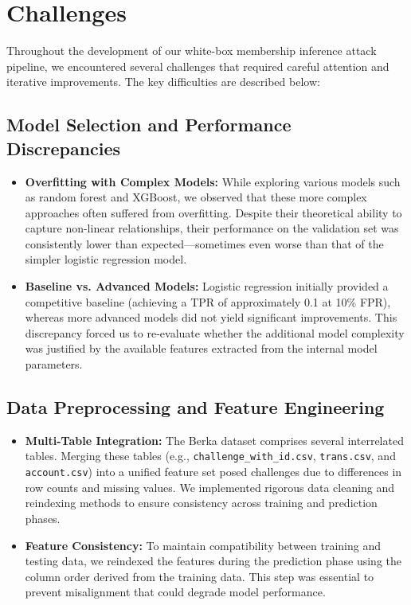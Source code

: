 \documentclass[12pt]{article}
\begin{document}
\section{Challenges}
\label{sec:challenges}
Throughout the development of our white-box membership inference attack pipeline, we encountered several challenges that required careful attention and iterative improvements. The key difficulties are described below:

\subsection{Model Selection and Performance Discrepancies}
\begin{itemize}
    \item \textbf{Overfitting with Complex Models:}  
    While exploring various models such as random forest and XGBoost, we observed that these more complex approaches often suffered from overfitting. Despite their theoretical ability to capture non-linear relationships, their performance on the validation set was consistently lower than expected—sometimes even worse than that of the simpler logistic regression model.
    
    \item \textbf{Baseline vs. Advanced Models:}  
    Logistic regression initially provided a competitive baseline (achieving a TPR of approximately 0.1 at 10\% FPR), whereas more advanced models did not yield significant improvements. This discrepancy forced us to re-evaluate whether the additional model complexity was justified by the available features extracted from the internal model parameters.
\end{itemize}

\subsection{Data Preprocessing and Feature Engineering}
\begin{itemize}
    \item \textbf{Multi-Table Integration:}  
    The Berka dataset comprises several interrelated tables. Merging these tables (e.g., \texttt{challenge\_with\_id.csv}, \texttt{trans.csv}, and \texttt{account.csv}) into a unified feature set posed challenges due to differences in row counts and missing values. We implemented rigorous data cleaning and reindexing methods to ensure consistency across training and prediction phases.
    
    \item \textbf{Feature Consistency:}  
    To maintain compatibility between training and testing data, we reindexed the features during the prediction phase using the column order derived from the training data. This step was essential to prevent misalignment that could degrade model performance.
\end{itemize}
\end{document}
